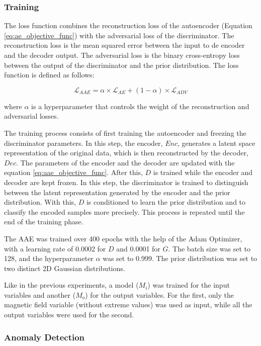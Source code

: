 \subsubsection*{Training}
The loss function combines the reconstruction loss of the autoencoder (Equation \ref{eq:ae_objective_func}) with the adversarial loss of the discriminator. The reconstruction loss is the mean squared error between the input to de encoder and the decoder output. The adversarial loss is the binary cross-entropy loss between the output of the discriminator and the prior distribution. The loss function is defined as follows:

\begin{equation}\label{eq:aae_objective_func}
    \mathcal{L}_{AAE} = \alpha \times \mathcal{L}_{AE} + (1-\alpha) \times \mathcal{L}_{ADV}
\end{equation}

where $\alpha$ is a hyperparameter that controls the weight of the reconstruction and adversarial losses.

The training process consists of first training the autoencoder and freezing the discriminator parameters. In this step, the encoder, $Enc$, generates a latent space representation of the original data, which is then reconstructed by the decoder, $Dec$. The parameters of the encoder and the decoder are updated with the equation \ref{eq:aae_objective_func}. After this, $D$ is trained while the encoder and decoder are kept frozen. In this step, the discriminator is trained to distinguish between the latent representation generated by the encoder and the prior distribution. With this, $D$ is conditioned to learn the prior distribution and to classify the encoded samples more precisely. This process is repeated until the end of the training phase.

The AAE was trained over 400 epochs with the help of the Adam Optimizer, with a learning rate of 0.0002 for $D$ and 0.0001 for $G$. The batch size was set to 128, and the hyperparameter $\alpha$ was set to 0.999. The prior distribution was set to two distinct 2D Gaussian distributions. 

Like in the previous experiments, a model ($M_i$) was trained for the input variables and another ($M_o$) for the output variables. For the first, only the magnetic field variable (without extreme values) was used as input, while all the output variables were used for the second.

\subsubsection*{Anomaly Detection}

